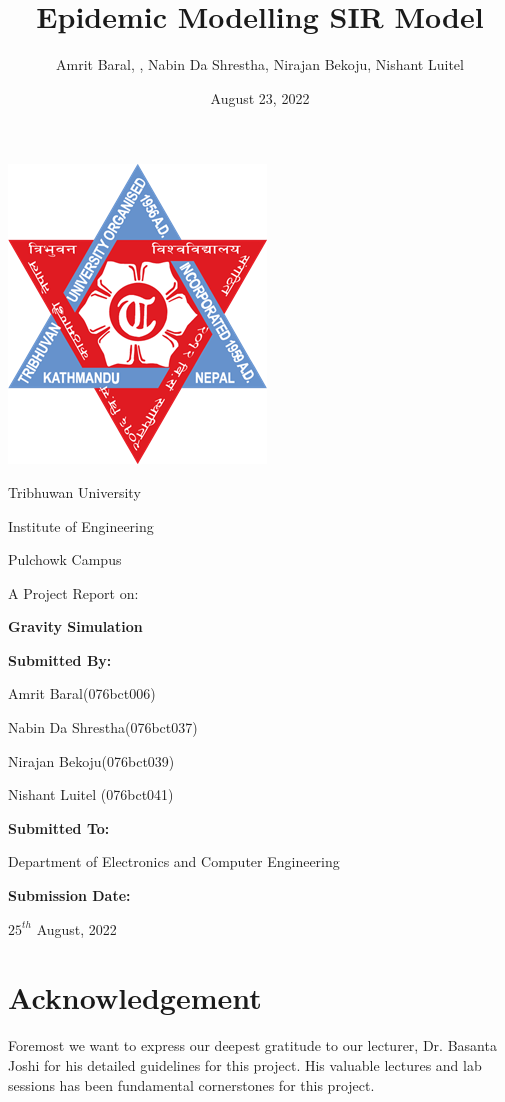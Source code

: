 \documentclass[12pt]{article}
\title{Epidemic Modelling SIR Model}
\author{Amrit Baral, , Nabin Da Shrestha, Nirajan Bekoju, Nishant Luitel}
\date{August 23, 2022}
\begin{document}
  

\bigskip
\bigskip
\bigskip
\bigskip

\begin{center}
\includegraphics[scale = 0.5]{logo.png}

Tribhuwan University

Institute of Engineering

Pulchowk Campus

\bigskip
\bigskip
\bigskip
\bigskip

\noindent\makebox[\linewidth]
{\rule{15cm}{0.4pt}}
A Project Report on:

\textbf{\large Gravity Simulation}
\noindent\makebox[\linewidth]
{\rule{15cm}{0.4pt}}

\bigskip
\bigskip
\bigskip
\bigskip
\textbf{Submitted By:}

Amrit Baral(076bct006)

Nabin Da Shrestha(076bct037)

Nirajan Bekoju(076bct039)

Nishant Luitel (076bct041)

\bigskip
\bigskip
\bigskip
\bigskip
\textbf{Submitted To:}

Department of Electronics and Computer Engineering

\bigskip
\bigskip
\bigskip
\bigskip
\textbf{Submission Date:} 

$25^{th}$ August, 2022

\end{center}



\clearpage

\section{Acknowledgement}
Foremost we want to express our deepest gratitude to our lecturer, Dr. Basanta Joshi
for his detailed guidelines for this project. His valuable lectures and lab sessions has been
fundamental cornerstones for this project.
\end{document}
